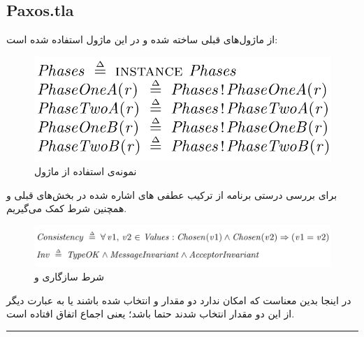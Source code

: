 \documentclass{article}
\begin{document}
\begin{multicols}{2}
\subsection*{Paxos.tla}
از ماژول‌های قبلی
ساخته شده و در این ماژول استفاده شده است:
\begin{figure}[H]
    \centering
    \includegraphics[width=0.60\linewidth]{Photos/HW6/instance.png}
    \caption{
    نمونه‌ی استفاده از ماژول
    }
    \label{fig:my_label}
\end{figure}
برای بررسی درستی برنامه از ترکیب عطفی
های اشاره شده در بخش‌های قبلی و همچنین شرط
کمک می‌گیریم.
\begin{figure}[H]
    \centering
    \includegraphics[width=0.99\linewidth]{Photos/HW6/inv.png}
    \caption{
    شرط سازگاری و
    }
    \label{fig:my_label}
\end{figure}
در اینجا
بدین معناست که امکان ندارد دو مقدار
و
انتخاب شده باشند یا به عبارت دیگر از این دو مقدار انتخاب شدند حتما
باشد؛ یعنی اجماع اتفاق افتاده است.\\
\rule{\linewidth}{1pt}


\end{multicols}
\end{document}
